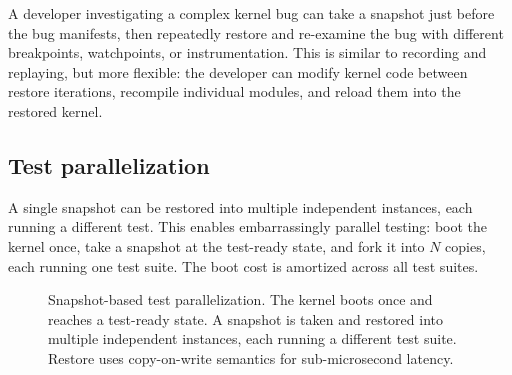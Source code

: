 A developer investigating a complex kernel bug can take a snapshot
just before the bug manifests, then repeatedly restore and re-examine
the bug with different breakpoints, watchpoints, or instrumentation.
This is similar to recording and replaying, but more flexible: the
developer can modify kernel code between restore iterations, recompile
individual modules, and reload them into the restored kernel.

\subsection{Test parallelization}

A single snapshot can be restored into multiple independent \UML{}
instances, each running a different test.  This enables embarrassingly
parallel testing: boot the kernel once, take a snapshot at the
test-ready state, and fork it into $N$ copies, each running one test
suite.  The boot cost is amortized across all test suites.

\begin{figure}[ht]
\centering
{}
\caption[Snapshot-based test parallelization]{%
  Snapshot-based test parallelization.  The kernel boots once and
  reaches a test-ready state.  A snapshot is taken and restored into
  multiple independent instances, each running a different test suite.
  Restore uses copy-on-write semantics for sub-microsecond latency.
}
\label{fig:app-snapshot-parallel}
\end{figure}


